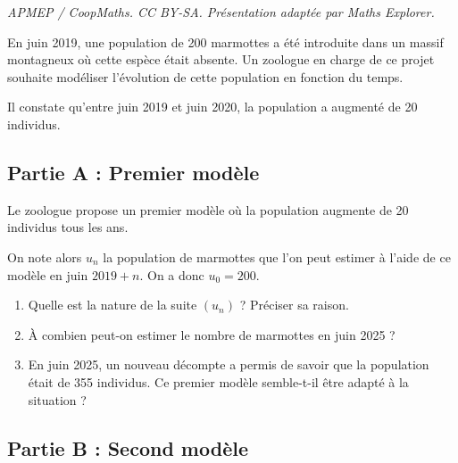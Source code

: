 \documentclass[10pt]{article}
\begin{document}
\noindent\textit{APMEP / CoopMaths. CC BY-SA. Présentation adaptée par Maths Explorer.}\par\medskip
En juin 2019, une population de 200 marmottes a été introduite dans un massif montagneux où cette espèce était absente. Un zoologue en charge de ce projet souhaite modéliser l'évolution de cette population en fonction du temps.
	
	Il constate qu'entre juin 2019 et juin 2020, la population a augmenté de 20 individus.
	
	\subsection*{Partie A : Premier modèle}
	
	Le zoologue propose un premier modèle où la population augmente de 20 individus tous les ans.
	
	On note alors $u_{n}$ la population de marmottes que l'on peut estimer à l'aide de ce modèle en juin $2019+n$. On a donc $u_{0}=200$.
	
	\begin{enumerate}
		\item Quelle est la nature de la suite $\left(u_{n}\right)$ ? Préciser sa raison.
		
		\item À combien peut-on estimer le nombre de marmottes en juin 2025 ?
		
		\item En juin 2025, un nouveau décompte a permis de savoir que la population était de 355 individus. Ce premier modèle semble-t-il être adapté à la situation ?
	\end{enumerate}
	
	\subsection*{Partie B : Second modèle}
	
\end{document}
